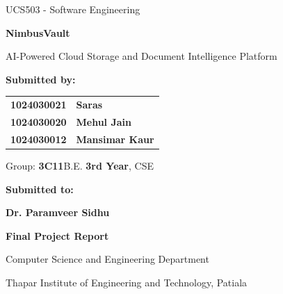 \documentclass[11pt,a4paper]{report}
\begin{document}
\begin{titlepage}
\centering
\vspace*{1.6cm}
{\Large UCS503 - Software Engineering\par}
\vspace{1.8cm}
{\huge\bfseries NimbusVault\par}
\vspace{0.6cm}
{\Large AI-Powered Cloud Storage and Document Intelligence Platform\par}
\vspace{2.0cm}
{\large\bfseries Submitted by:\par}
\vspace{0.4cm}
\begin{tabular}{ll}
\textbf{1024030021} & \textbf{Saras}\\
\textbf{1024030020} & \textbf{Mehul Jain}\\
\textbf{1024030012} & \textbf{Mansimar Kaur}\\
\end{tabular}
\par\vspace{0.4cm}
Group: \textbf{3C11}\quad B.E. \textbf{3rd Year}, CSE\par
\vspace{2.0cm}
{\large\bfseries Submitted to:\par}
\vspace{0.4cm}
\textbf{Dr. Paramveer Sidhu}\par
\vspace{0.3cm}
\textbf{Final Project Report}\par
\vfill
Computer Science and Engineering Department\par
\vspace{0.2cm}
Thapar Institute of Engineering and Technology, Patiala\par
\vspace*{1cm}
\end{titlepage}

\tableofcontents
\clearpage
{}








\end{document}

